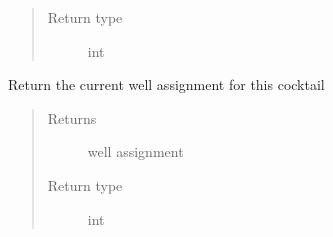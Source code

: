 \documentclass[letterpaper,10pt,english]{sphinxmanual}
\begin{document}
\begin{fulllineitems}
\begin{fulllineitems}
\begin{quote}
\begin{description}
\item[{Return type}] \leavevmode
int

\end{description}\end{quote}

\end{fulllineitems}


\begin{fulllineitems}
\label{\detokenize{polo.crystallography:polo.crystallography.cocktail.Cocktail.well_assignment}}
Return the current well assignment for this cocktail
\begin{quote}\begin{description}
\item[{Returns}] \leavevmode
well assignment

\item[{Return type}] \leavevmode
int

\end{description}\end{quote}

\end{fulllineitems}


\end{fulllineitems}

\end{document}
